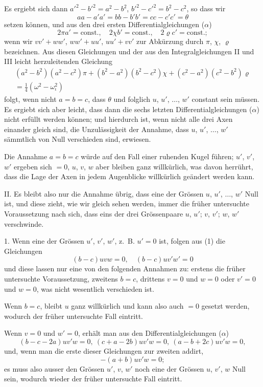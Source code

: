 \documentclass[12pt,a4paper]{book}
\theoremstyle{definition}
\theoremstyle{remark}
\begin{document}
Es ergiebt sich dann $a'^2 - b'^2 = a^2 - b^2$, $b'^2 - c'^2 = b^2 - c^2$, so dass wir
\[ aa - a'a' = bb - b'b' = cc - c'c' = \theta \]
setzen können, und aus den drei ersten Differentialgleichungen ($\alpha$)
\[ 2\pi a' = \text{const.},\quad 2\chi b' = \text{const.},\quad 2\varrho c' = \text{const.}; \]
wenn wir $vv' + ww'$, $ww' + uu'$, $uu' + vv'$ zur Abkürzung durch $\pi$, $\chi$, $\varrho$ bezeichnen. Aus diesen Gleichungen und der aus den Integralgleichungen II und III leicht herzuleitenden Gleichung
\begin{multline*}
(a^2-b^2)(a^2-c^2)\pi + (b^2-a^2)(b^2-c^2)\chi + (c^2-a^2)(c^2-b^2)\varrho\\
= \tfrac{1}{4}(\omega^2 - \omega_\iota^2)
\end{multline*}
folgt, wenn nicht $a = b = c$, dass $\theta$ und folglich $u$, $u'$, $\ldots$, $w'$ constant sein müssen. Es ergiebt sich aber leicht, dass dann die sechs letzten Differentialgleichungen ($\alpha$) nicht erfüllt werden können; und hierdurch ist, wenn nicht alle drei Axen einander gleich sind, die Unzulässigkeit der Annahme, dass $u$, $u'$, $\ldots$, $w'$ sämmtlich von Null verschieden sind, erwiesen.

Die Annahme $a = b = c$ würde auf den Fall einer ruhenden Kugel führen; $u'$, $v'$, $w'$ ergeben sich $= 0$, $u$, $v$, $w$ aber bleiben ganz willkürlich, was davon herrührt, dass die Lage der Axen in jedem Augenblicke willkürlich geändert werden kann.

II. Es bleibt also nur die Annahme übrig, dass eine der Grössen $u$, $u'$, $\ldots$, $w'$ Null ist, und diese zieht, wie wir gleich sehen werden, immer die früher untersuchte Voraussetzung nach sich, dass eins der drei Grössenpaare $u$, $u'$; $v$, $v'$; $w$, $w'$ verschwinde.

1. Wenn eine der Grössen $u'$, $v'$, $w'$, z.~B. $u' = 0$ ist, folgen aus (1) die Gleichungen
\[ (b-c)uvw = 0,\quad (b-c)uv'w' = 0 \]
und diese lassen nur eine von den folgenden Annahmen zu: erstens die früher untersuchte Voraussetzung, zweitens $b = c$, drittens $v = 0$ und $w = 0$ oder $v' = 0$ und $w = 0$, was nicht wesentlich verschieden ist.

Wenn $b = c$, bleibt $u$ ganz willkürlich und kann also auch $= 0$ gesetzt werden, wodurch der früher untersuchte Fall eintritt.

Wenn $v = 0$ und $w' = 0$, erhält man aus den Differentialgleichungen ($\alpha$)
\[ (b-c-2a)uv'w = 0,\ (c+a-2b)uv'w = 0,\ (a-b+2c)uv'w = 0, \]
und, wenn man die erste dieser Gleichungen zur zweiten addirt,
\[ -(a+b)uv'w = 0; \]
es muss also ausser den Grössen $u'$, $v$, $w'$ noch eine der Grössen $u$, $v'$, $w$ Null sein, wodurch wieder der früher untersuchte Fall eintritt.
\end{document}
